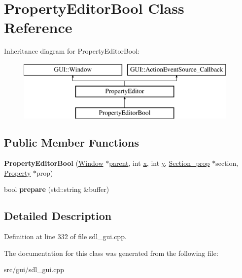 \hypertarget{classPropertyEditorBool}{\section{Property\-Editor\-Bool Class Reference}
\label{classPropertyEditorBool}
}
Inheritance diagram for Property\-Editor\-Bool\-:\begin{figure}[H]
\begin{center}
\leavevmode
\includegraphics[height=3.000000cm]{classPropertyEditorBool}
\end{center}
\end{figure}
\subsection*{Public Member Functions}
\begin{DoxyCompactItemize}
\item 
\hypertarget{classPropertyEditorBool_a428b59bceb9e5d0c7fae949eb43511da}{{\bfseries Property\-Editor\-Bool} (\hyperlink{classGUI_1_1Window_ae828e9daa964dfc65a3550fb03117d30}{Window} $\ast$\hyperlink{classGUI_1_1Window_a2e593ff65e7702178d82fe9010a0b539}{parent}, int \hyperlink{classGUI_1_1Window_a6ca6a80ca00c9e1d8ceea8d3d99a657d}{x}, int \hyperlink{classGUI_1_1Window_a0ee8e923aff2c3661fc2e17656d37adf}{y}, \hyperlink{classSection__prop}{Section\-\_\-prop} $\ast$section, \hyperlink{classProperty}{Property} $\ast$prop)}\label{classPropertyEditorBool_a428b59bceb9e5d0c7fae949eb43511da}

\item 
\hypertarget{classPropertyEditorBool_a44c917ecde4468be2873d8580d5072ce}{bool {\bfseries prepare} (std\-::string \&buffer)}\label{classPropertyEditorBool_a44c917ecde4468be2873d8580d5072ce}

\end{DoxyCompactItemize}


\subsection{Detailed Description}


Definition at line 332 of file sdl\-\_\-gui.\-cpp.



The documentation for this class was generated from the following file\-:\begin{DoxyCompactItemize}
\item 
src/gui/sdl\-\_\-gui.\-cpp\end{DoxyCompactItemize}

